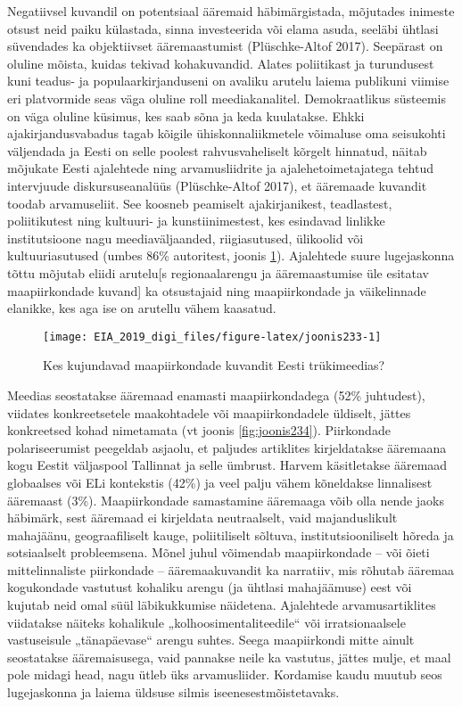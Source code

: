 \documentclass[]{book}
\begin{document}
Negatiivsel kuvandil on potentsiaal ääremaid häbimärgistada, mõjutades inimeste otsust neid paiku
külastada, sinna investeerida või elama asuda, seeläbi ühtlasi süvendades ka objektiivset ääremaastumist
(Plüschke-Altof 2017). Seepärast on oluline mõista, kuidas tekivad kohakuvandid. Alates poliitikast ja
turundusest kuni teadus- ja populaarkirjanduseni on avaliku arutelu laiema publikuni viimise eri platvormide
seas väga oluline roll meediakanalitel. Demokraatlikus süsteemis on väga oluline küsimus, kes saab sõna ja
keda kuulatakse. Ehkki ajakirjandusvabadus tagab kõigile ühiskonnaliikmetele võimaluse oma seisukohti
väljendada ja Eesti on selle poolest rahvusvaheliselt kõrgelt hinnatud, näitab mõjukate Eesti ajalehtede ning
arvamusliidrite ja ajalehetoimetajatega tehtud intervjuude diskursuseanalüüs (Plüschke-Altof 2017), et
ääremaade kuvandit toodab arvamuseliit. See koosneb peamiselt ajakirjanikest, teadlastest, poliitikutest
ning kultuuri- ja kunstiinimestest, kes esindavad linlikke institutsioone nagu meediaväljaanded, riigiasutused, ülikoolid või kultuuriasutused (umbes 86\% autoritest, joonis \ref{fig:joonis233}). Ajalehtede suure lugejaskonna tõttu mõjutab eliidi arutelu{[}s regionaalarengu ja ääremaastumise üle esitatav maapiirkondade kuvand{]} ka otsustajaid ning maapiirkondade ja väikelinnade elanikke, kes aga ise on arutellu vähem kaasatud.

\begin{figure}

{\centering \texttt{[image: EIA\_2019\_digi\_files/figure-latex/joonis233-1]} 

}

\caption{Kes kujundavad maapiirkondade kuvandit Eesti trükimeedias?}\label{fig:joonis233}
\end{figure}

Meedias seostatakse ääremaad enamasti maapiirkondadega (52\% juhtudest), viidates konkreetsetele
maakohtadele või maapiirkondadele üldiselt, jättes konkreetsed kohad nimetamata (vt joonis \ref{fig:joonis234}).
Piirkondade polariseerumist peegeldab asjaolu, et paljudes artiklites kirjeldatakse ääremaana kogu Eestit
väljaspool Tallinnat ja selle ümbrust. Harvem käsitletakse ääremaad globaalses või ELi kontekstis (42\%) ja
veel palju vähem kõneldakse linnalisest ääremaast (3\%). Maapiirkondade samastamine ääremaaga võib olla
nende jaoks häbimärk, sest ääremaad ei kirjeldata neutraalselt, vaid majanduslikult mahajäänu,
geograafiliselt kauge, poliitiliselt sõltuva, institutsiooniliselt hõreda ja sotsiaalselt probleemsena. Mõnel juhul võimendab maapiirkondade -- või õieti mittelinnaliste piirkondade -- ääremaakuvandit ka narratiiv, mis
rõhutab ääremaa kogukondade vastutust kohaliku arengu (ja ühtlasi mahajäämuse) eest või kujutab neid
omal süül läbikukkumise näidetena. Ajalehtede arvamusartiklites viidatakse näiteks kohalikule
„kolhoosimentaliteedile`` või irratsionaalsele vastuseisule „tänapäevase`` arengu suhtes. Seega maapiirkondi
mitte ainult seostatakse ääremaisusega, vaid pannakse neile ka vastutus, jättes mulje, et maal pole midagi
head, nagu ütleb üks arvamusliider. Kordamise kaudu muutub seos lugejaskonna ja laiema üldsuse silmis
iseenesestmõistetavaks.
\end{document}
